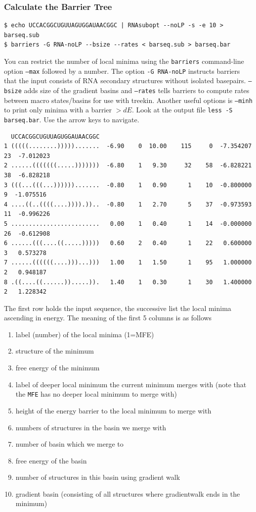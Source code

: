 \documentclass[a4paper]{article}
\newcommand{\frametitle}[1]{\subsubsection{#1}}
\begin{document}
\frametitle{Calculate the Barrier Tree}
\begin{verbatim}
$ echo UCCACGGCUGUUAGUGGAUAACGGC | RNAsubopt --noLP -s -e 10 > barseq.sub
$ barriers -G RNA-noLP --bsize --rates < barseq.sub > barseq.bar
\end{verbatim}%
You can restrict the number of local minima using the \texttt{barriers}
command-line option \texttt{--max} followed by a number. The option \texttt{-G RNA-noLP} 
instructs barriers that the input consists of RNA secondary structures without isolated
 basepairs. \texttt{--bsize} adds size of the gradient basins and \texttt{--rates} tells 
barriers to compute rates between macro states/basins for use with treekin. Another useful
options is \texttt{--minh} to print only minima with a barrier $> dE$. Look at the
output file \texttt{less -S barseq.bar}.  Use the arrow keys to navigate.
\begin{small}
\begin{verbatim}
  UCCACGGCUGUUAGUGGAUAACGGC
1 (((((........))))).......  -6.90    0  10.00    115     0  -7.354207     23  -7.012023
2 ......(((((((.....)))))))  -6.80    1   9.30     32    58  -6.828221     38  -6.828218
3 (((...(((...)))))).......  -0.80    1   0.90      1    10  -0.800000      9  -1.075516
4 ....((..((((....)))).))..  -0.80    1   2.70      5    37  -0.973593     11  -0.996226
5 .........................   0.00    1   0.40      1    14  -0.000000     26  -0.612908
6 ......(((....((.....)))))   0.60    2   0.40      1    22   0.600000      3   0.573278
7 ......((((((....)))...)))   1.00    1   1.50      1    95   1.000000      2   0.948187
8 .((....((......)).....)).   1.40    1   0.30      1    30   1.400000      2   1.228342
\end{verbatim}

The first row holds the input sequence, the successive list the local
minima ascending in energy. The meaning of the first 5 columns is as follows
\begin{enumerate}
\item label (number) of the local minima (1=MFE)
\item structure of the minimum
\item free energy of the minimum
\item label of deeper local minimum the current minimum merges with (note that the
  \texttt{MFE} has no deeper local minimum to merge with)
\item height of the energy barrier to the local minimum to merge with
\item numbers of structures in the basin we merge with
\item number of basin which we merge to
\item free energy of the basin
\item number of structures in this basin using gradient walk
\item gradient basin (consisting of all structures where gradientwalk ends in the minimum)
\end{enumerate}
\end{small}
\end{document}
